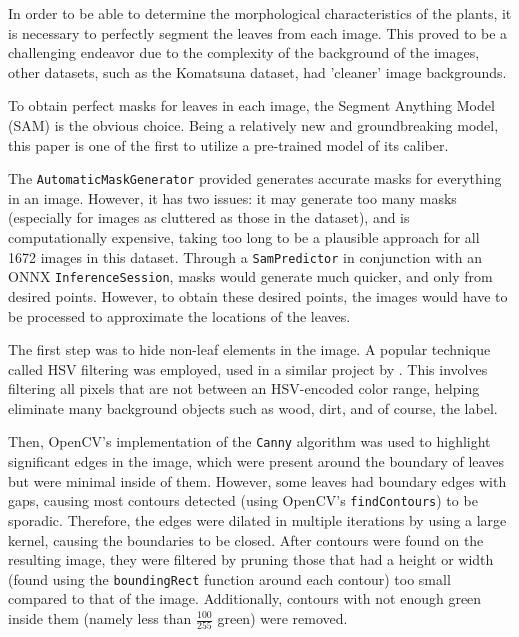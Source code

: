 \documentclass[final,5p,times,twocolumn,authoryear]{elsarticle}
\begin{document}
In order to be able to determine the morphological characteristics of the plants, it is necessary to perfectly segment the leaves from each image. This proved to be a challenging endeavor due to the complexity of the background of the images, other datasets, such as the Komatsuna dataset, \citep{uchiyama2017easy} had 'cleaner' image backgrounds.

To obtain perfect masks for leaves in each image, the Segment Anything Model (SAM) \citep{kirillov2023segment} is the obvious choice. Being a relatively new and groundbreaking model, this paper is one of the first to utilize a pre-trained model of its caliber.

The \verb|AutomaticMaskGenerator| provided generates accurate masks for everything in an image. However, it has two issues: it may generate too many masks (especially for images as cluttered as those in the dataset), and is computationally expensive, taking too long to be a plausible approach for all 1672 images in this dataset. Through a \verb|SamPredictor| in conjunction with an ONNX \citep{bai2019onnx} \verb|InferenceSession|, masks would generate much quicker, and only from desired points. However, to obtain these desired points, the images would have to be processed to approximate the locations of the leaves.

The first step was to hide non-leaf elements in the image. A popular technique called HSV filtering was employed, used in a similar project by \cite{szachowicz2021komatsuna}. This involves filtering all pixels that are not between an HSV-encoded color range, helping eliminate many background objects such as wood, dirt, and of course, the label.

Then, OpenCV's implementation of the \verb|Canny| algorithm was used to highlight significant edges in the image, which were present around the boundary of leaves but were minimal inside of them. However, some leaves had boundary edges with gaps, causing most contours detected (using OpenCV's \verb|findContours|) to be sporadic. Therefore, the edges were dilated in multiple iterations by using a large kernel, causing the boundaries to be closed. After contours were found on the resulting image, they were filtered by pruning those that had a height or width (found using the \verb|boundingRect| function around each contour) too small compared to that of the image. Additionally, contours with not enough green inside them (namely less than $\frac{100}{255}$ green) were removed.
\end{document}
